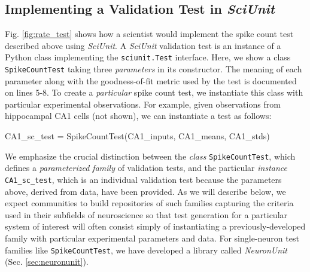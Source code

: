 \documentclass[11pt,letterpaper]{article}
\let\verbx\lstinline
\begin{document}
\subsection{Implementing a Validation Test in \textit{SciUnit}}
Fig. \ref{fig:rate_test} shows how a scientist would implement the spike count test described above using \textit{SciUnit}. 
A \textit{SciUnit} validation test is an {instance} of a Python class implementing the \verbx{sciunit.Test} interface. 
Here, we show a class \verbx{SpikeCountTest} taking three \emph{parameters} in its constructor. The meaning of each parameter along with the goodness-of-fit metric used by the test is documented on lines 5-8. 
To create a \emph{particular} spike count test, we instantiate this class with particular experimental observations. 
For example, given observations from hippocampal CA1 cells (not shown), we can instantiate a test as follows:
\begin{python}
  CA1_sc_test = SpikeCountTest(CA1_inputs, CA1_means, CA1_stds)
\end{python}
We emphasize the crucial distinction between the \textit{class} \verbx{SpikeCountTest}, which defines a \emph{parameterized family} of validation tests, and the particular \textit{instance} \verbx{CA1_sc_test}, which is an individual validation test because the parameters above, derived from data, have been provided. 
As we will describe below, we expect communities to build repositories of such families capturing the criteria used in their subfields of neuroscience so that test generation for a particular system of interest will often consist simply of instantiating a previously-developed family with particular experimental parameters and data. 
For single-neuron test families like \verbx{SpikeCountTest}, we have developed a library called \textit{NeuronUnit} \cite{neurounit_url} (Sec. \ref{sec:neuronunit}). 
\end{document}
